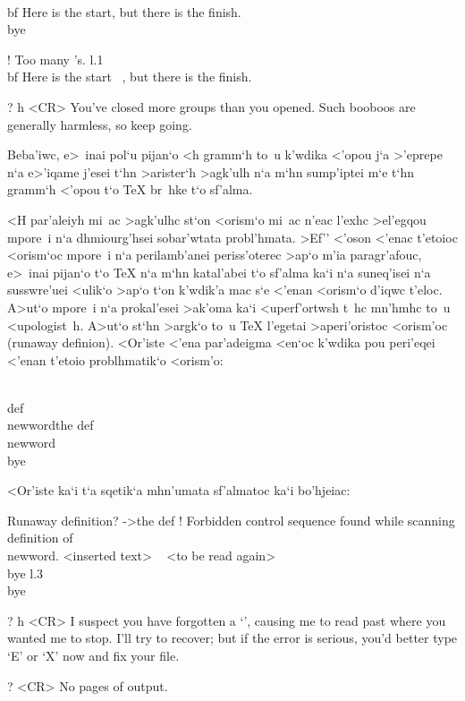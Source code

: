 \beginuser
\\bf Here is the start\rb, but there is the finish.
\\bye
\enduser

\beginuser \obeyspaces
! Too many \rb's.
l.1 \\bf Here is the start\rb
\                          , but there is the finish.

? h <CR>
You've closed more groups than you opened.
Such booboos are generally harmless, so keep going.
\enduser

\noindent
Beba'iwc, e>~inai pol`u pijan`o <h gramm`h to~u k'wdika <'opou j`a
>'eprepe n`a e>'iqame j'esei t`hn >arister`h >agk'ulh n`a m`hn
sump'iptei m`e t`hn gramm`h <'opou t`o {\rm \TeX} br~hke t`o sf'alma.

<H par'aleiyh mi~ac >agk'ulhc st`on <orism`o mi~ac n'eac l'exhc
>el'egqou mpore~i n`a dhmiourg'hsei sobar'wtata probl'hmata.  >Ef''
<'oson <'enac t'etoioc <orism`oc mpore~i n`a perilamb'anei
peris\-s'o\-te\-rec >ap`o m'ia paragr'afouc, e>~inai pijan`o t`o {\rm
\TeX} n`a m`hn katal'abei t`o sf'alma ka`i n`a suneq'isei n`a
susswre'uei <ulik`o >ap`o t`on k'wdik'a mac s`e <'enan <orism`o d'iqwc
t'eloc.  A>ut`o mpore~i n`a pro\-ka\-l'esei >ak'oma ka`i <uperf'ortwsh
t~hc mn'hmhc to~u <upologist~h.  A>ut`o st`hn >argk`o to~u {\rm \TeX}
l'egetai {\tengs >aperi'oristoc <orism'oc} ({\rm runaway definion}).%
<Or'iste <'ena par'adeigma <en`oc k'wdika pou peri'eqei <'enan t'etoio
problhmatik`o <orism'o:

\vbox{
\beginuser
\\def\\newword\lb the def
\\newword
\\bye
\enduser
}

\noindent
<Or'iste ka`i t`a sqetik`a mhn'umata sf'almatoc ka`i bo'hjeiac:

\beginuser \obeyspaces
Runaway definition?
->the def
! Forbidden control sequence found while scanning definition of \\newword.
<inserted text>
\                \rb
<to be read again>
\                   \\bye
l.3 \\bye

? h <CR>
I suspect you have forgotten a `\rb', causing me
to read past where you wanted me to stop.
I'll try to recover; but if the error is serious,
you'd better type `E' or `X' now and fix your file.

? <CR>
No pages of output.
\enduser

